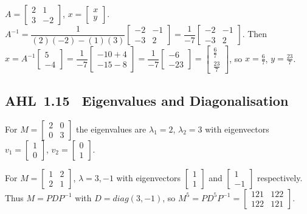 \documentclass[11pt]{article}
\def\mathbf#1{#1}%
\def\mathrm#1{#1}%
\newcommand{\tocsubsection}[1]{\subsection{#1}}
\begin{document}
\begin{solution}
$A=\begin{bmatrix}2&1\\3&-2\end{bmatrix}$, $\mathbf{x}=\begin{bmatrix}x\\y\end{bmatrix}$.
$A^{-1}=\dfrac{1}{(2)(-2)-(1)(3)}\begin{bmatrix}-2&-1\\-3&2\end{bmatrix}=\dfrac{1}{-7}\begin{bmatrix}-2&-1\\-3&2\end{bmatrix}$.
Then $\mathbf{x}=A^{-1}\begin{bmatrix}5\\-4\end{bmatrix}=\dfrac{1}{-7}\begin{bmatrix}-10+4\\-15-8\end{bmatrix}=\dfrac{1}{-7}\begin{bmatrix}-6\\-23\end{bmatrix}=\begin{bmatrix}\tfrac{6}{7}\\\tfrac{23}{7}\end{bmatrix}$,
so $x=\tfrac{6}{7}$, $y=\tfrac{23}{7}$.
\end{solution}


\tocsubsection{AHL 1.15 \; Eigenvalues and Diagonalisation}

\begin{solution}
For $M=\begin{bmatrix}2&0\\0&3\end{bmatrix}$ the eigenvalues are $\lambda_1=2$, $\lambda_2=3$ with eigenvectors $\mathbf{v}_1=\begin{bmatrix}1\\0\end{bmatrix}$, $\mathbf{v}_2=\begin{bmatrix}0\\1\end{bmatrix}$.
\end{solution}

\begin{solution}
For $M=\begin{bmatrix}1&2\\2&1\end{bmatrix}$, $\lambda=3,-1$ with eigenvectors $\begin{bmatrix}1\\1\end{bmatrix}$ and $\begin{bmatrix}1\\-1\end{bmatrix}$ respectively.
Thus $M=PDP^{-1}$ with $D=\mathrm{diag}(3,-1)$, so $M^5=PD^5P^{-1}=\begin{bmatrix}121&122\\122&121\end{bmatrix}$.
\end{solution}
\end{document}
